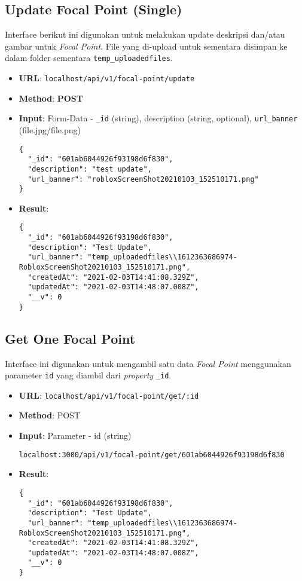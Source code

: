\documentclass[a4paper]{report}
\begin{document}
\subsection{Update Focal Point (Single) }
Interface berikut ini digunakan untuk melakukan update deskripsi dan/atau gambar untuk \textit{Focal Point}. File yang di-upload untuk sementara disimpan ke dalam folder sementara \verb|temp_uploadedfiles|.
\begin{itemize}
  \item \textbf{URL}: \verb|localhost/api/v1/focal-point/update|
  \item \textbf{Method}: \textbf{POST} 
  \item \textbf{Input}: Form-Data - \verb|_id| (string), description (string, optional), \verb|url_banner| (file.jpg/file.png)
    \begin{lstlisting}
{
  "_id": "601ab6044926f93198d6f830",
  "description": "test update",
  "url_banner": "robloxScreenShot20210103_152510171.png"
}
    \end{lstlisting}
  \item \textbf{Result}:
    \begin{lstlisting}
{
  "_id": "601ab6044926f93198d6f830",
  "description": "Test Update",
  "url_banner": "temp_uploadedfiles\\1612363686974-RobloxScreenShot20210103_152510171.png",
  "createdAt": "2021-02-03T14:41:08.329Z",
  "updatedAt": "2021-02-03T14:48:07.008Z",
  "__v": 0
}
    \end{lstlisting}
\end{itemize}

\subsection{Get One Focal Point}
Interface ini digunakan untuk mengambil satu data \textit{Focal Point} menggunakan parameter \verb|id| yang diambil dari \textit{property} \verb|_id|.
\begin{itemize}
  \item \textbf{URL}: \verb|localhost/api/v1/focal-point/get/:id| 
  \item \textbf{Method}: POST
  \item \textbf{Input}: Parameter - id (string)
    \begin{lstlisting}
localhost:3000/api/v1/focal-point/get/601ab6044926f93198d6f830
    \end{lstlisting}
  \item \textbf{Result}:
    \begin{lstlisting}
{
  "_id": "601ab6044926f93198d6f830",
  "description": "Test Update",
  "url_banner": "temp_uploadedfiles\\1612363686974-RobloxScreenShot20210103_152510171.png",
  "createdAt": "2021-02-03T14:41:08.329Z",
  "updatedAt": "2021-02-03T14:48:07.008Z",
  "__v": 0
}
    \end{lstlisting}
\end{itemize}
\end{document}
